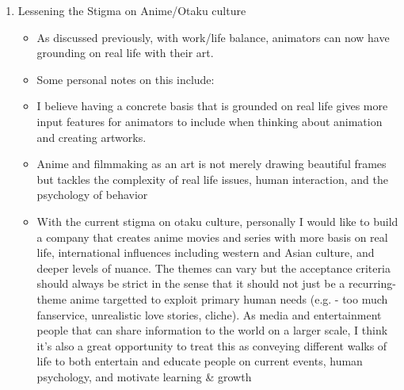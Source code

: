 \begin{enumerate}
    \item Lessening the Stigma on Anime/Otaku culture
    \begin{itemize}
        \item As discussed previously, with work/life balance, animators can now have grounding on real life with their art.
        \item Some personal notes on this include:
        \item I believe having a concrete basis that is grounded on real life gives more input features for animators to include when thinking about animation and creating artworks.
        \item Anime and filmmaking as an art is not merely drawing beautiful frames but tackles the complexity of real life issues, human interaction, and the psychology of behavior
        \item With the current stigma on otaku culture, personally I would like to build a company that creates anime movies and series with more basis on real life, international influences including western and Asian culture, and deeper levels of nuance. The themes can vary but the acceptance criteria should always be strict in the sense that it should not just be a recurring-theme anime targetted to exploit primary human needs (e.g. - too much fanservice, unrealistic love stories, cliche). As media and entertainment people that can share information to the world on a larger scale, I think it's also a great opportunity to treat this as conveying different walks of life to both entertain and educate people on current events, human psychology, and motivate learning \& growth
    \end{itemize}
\end{enumerate}